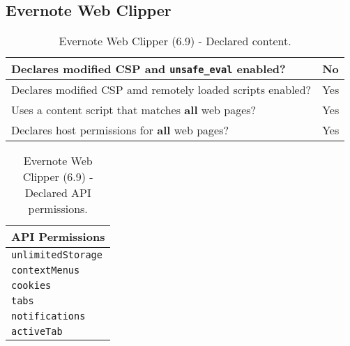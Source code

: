 \subsection{Evernote Web Clipper}

\begin{table}[h]
	\centering
	\begin{tabular}{|l|l|} \hline
		Declares modified CSP and \texttt{unsafe\_eval} enabled? & No \\ \hline
		Declares modified CSP amd remotely loaded scripts enabled? & Yes \\ \hline
		Uses a content script that matches \textbf{all} web pages? & Yes \\ \hline
		Declares host permissions for \textbf{all} web pages? & Yes \\ \hline
	\end{tabular}
	\caption{Evernote Web Clipper (6.9) - Declared content.}
\end{table}
\begin{table}[h]
	\centering
	\begin{tabular}{|l|} \hline
		\textbf{API Permissions} \\ \hline
		\texttt{unlimitedStorage} \\
		\texttt{contextMenus} \\
		\texttt{cookies} \\
		\texttt{tabs} \\
		\texttt{notifications} \\
		\texttt{activeTab} \\
		\hline
	\end{tabular}
	\caption{Evernote Web Clipper (6.9) - Declared API permissions.}
\end{table}
\newpage
